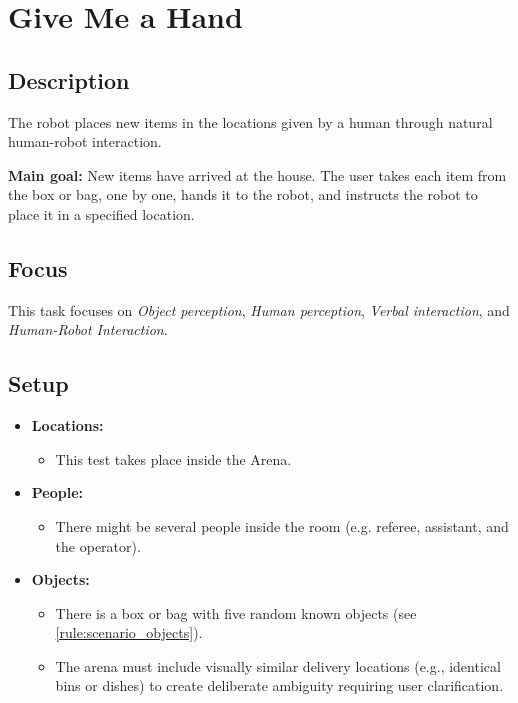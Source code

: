 \section{Give Me a Hand}
\label{test:give-me-a-hand}

\subsection*{Description}
The robot places new items in the locations given by a human through natural human-robot interaction.

\textbf{Main goal:}
New items have arrived at the house. The user takes each item from the box or bag, one by one, hands it to the robot, and instructs the robot to place it in a specified location.

\subsection*{Focus}
This task focuses on
\textit{Object perception},
\textit{Human perception},
\textit{Verbal interaction}, and
\textit{Human-Robot Interaction}.

\subsection*{Setup}
\begin{itemize}[nosep]	
	\item \textbf{Locations:} 
	\begin{itemize}
		\item This test takes place inside the Arena.
	\end{itemize}	 
	\item \textbf{People:} 
	\begin{itemize}
		\item There might be several people inside the room (e.g. referee, assistant, and the operator).
	\end{itemize}
	\item \textbf{Objects:}
		\begin{itemize}
			\item There is a box or bag with five random known objects (see \ref{rule:scenario_objects}).
			\item The arena must include visually similar delivery locations (e.g., identical bins or dishes) to create deliberate ambiguity requiring user clarification.
		\end{itemize}
\end{itemize}

